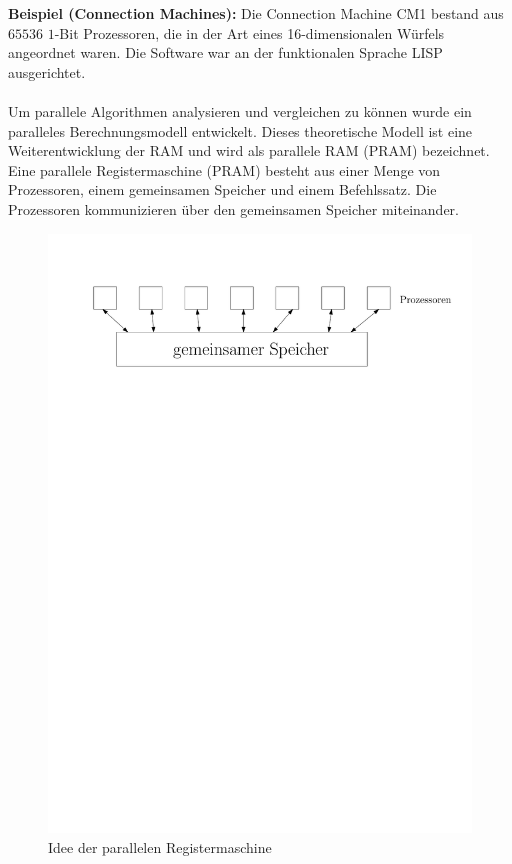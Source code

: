 {\bf{Beispiel (Connection Machines):}}
Die Connection Machine CM1 bestand aus $65536$ $1$-Bit Prozessoren, die in der Art eines 16-dimensionalen Würfels angeordnet waren. Die Software war an der funktionalen Sprache LISP ausgerichtet.
\\
\\
Um parallele Algorithmen analysieren und vergleichen zu können wurde ein paralleles Berechnungsmodell entwickelt. Dieses theoretische Modell ist eine Weiterentwicklung der RAM und wird als parallele RAM (PRAM) bezeichnet.
\\
Eine parallele Registermaschine (PRAM) besteht aus einer Menge von Prozessoren, einem gemeinsamen Speicher und einem Befehlssatz. Die Prozessoren kommunizieren über den gemeinsamen Speicher miteinander.
\begin{figure}[h!]
\centering
\includegraphics[scale=0.6]{bilder/PRAM.pdf}
\caption{Idee der parallelen Registermaschine}
\end{figure}

